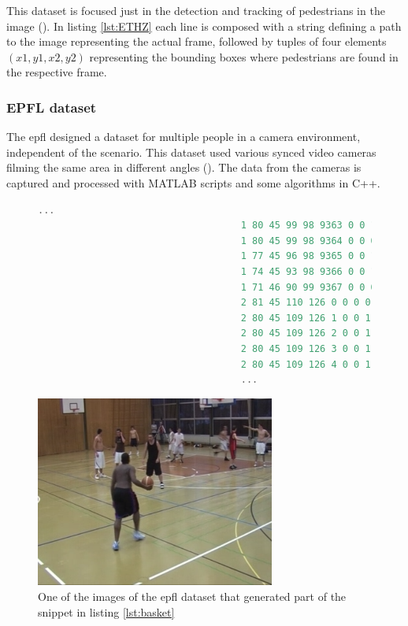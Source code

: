 This dataset is focused just in the detection and tracking of pedestrians in the image (\cite{ETHZEidgenossischeTechnischeHochschuleZurich}). In listing \ref{lst:ETHZ} each line is composed with a string defining a path to the image representing the actual frame, followed by tuples of four elements $(x1,y1,x2,y2)$ representing the bounding boxes where pedestrians are found in the respective frame. 

\subsubsection{EPFL dataset}
The \gls{epfl} designed a dataset for multiple people in a camera environment, independent of the scenario. This dataset used various synced video cameras filming the same area in different angles (\cite{Biliotti}). The data from the cameras is captured and processed with MATLAB scripts and some algorithms in C++.

\begin{figure}
\begin{center}
	\begin{lstlisting}[label={lst:basket}, caption={EPFL dataset file snippet.},language=c++]
									...
									1 80 45 99 98 9363 0 0 1 "PERSON"
									1 80 45 99 98 9364 0 0 0 "PERSON"
									1 77 45 96 98 9365 0 0 1 "PERSON"
									1 74 45 93 98 9366 0 0 1 "PERSON"
									1 71 46 90 99 9367 0 0 0 "PERSON"
									2 81 45 110 126 0 0 0 0 "PERSON"
									2 80 45 109 126 1 0 0 1 "PERSON"
									2 80 45 109 126 2 0 0 1 "PERSON"
									2 80 45 109 126 3 0 0 1 "PERSON"
									2 80 45 109 126 4 0 0 1 "PERSON"
									...	\end{lstlisting}
\end{center}
\end{figure}

\begin{figure}[htp]
	
	\centering
	\includegraphics[width=0.7\textwidth]{capstate/imgs/basket.png}
	
	\caption{One of the images of the \gls{epfl} dataset that generated part of the snippet in listing \ref{lst:basket} }
	\label{fig:basketimg}
	
\end{figure}


